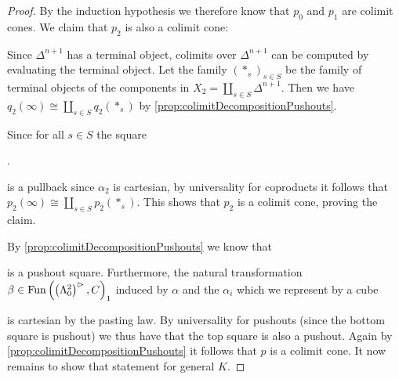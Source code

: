 \begin{lemma}
\begin{proof}
        By the induction hypothesis we therefore know that $p_0$ and $p_1$ are colimit cones. 
        We claim that $p_2$ is also a colimit cone:
        
        Since $\Delta^{n+1}$ has a terminal object, colimits over $\Delta^{n+1}$ can be computed by evaluating the terminal object.
        Let the family $(*_s)_{s\in S}$ be the family of terminal objects of the components in $X_2=\coprod\limits_{s\in S} \Delta^{n+1}$.
        Then we have $q_2(\infty)\cong\coprod\limits_{s\in S} q_2(*_s)$ by \cref{prop:colimitDecompositionPushouts}.

        Since for all $s\in S$ the square
        \begin{center}
            \;.
        \end{center}
        is a pullback since $\alpha_2$ is cartesian, by universality for coproducts it follows that $p_2(\infty)\cong\coprod\limits_{s\in S} p_2(*_s)$.
        This shows that $p_2$ is a colimit cone, proving the claim.
        
        By \cref{prop:colimitDecompositionPushouts} we know that 
        \begin{center}
        \end{center}
        is a pushout square.
        Furthermore, the natural transformation $\beta\in\operatorname{Fun}\left(\left(\Lambda_0^2\right)^{\rhd},C\right)_1$ induced by $\alpha$ and the $\alpha_i$ which we represent by a cube
        \begin{center}
        \end{center}
        is cartesian by the pasting law.
        By universality for pushouts (since the bottom square is pushout) we thus have that the top square is also a pushout.
        Again by \cref{prop:colimitDecompositionPushouts} it follows that $p$ is a colimit cone.
        It now remains to show that statement for general $K$.


\end{proof}
\end{lemma}
